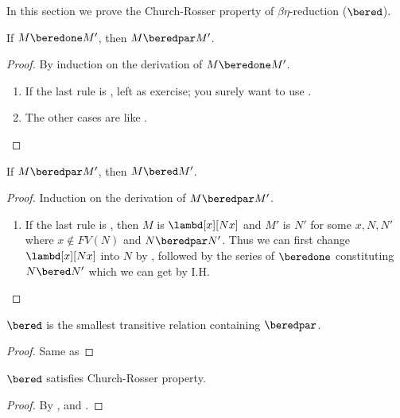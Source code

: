 \documentclass[../../../include/open-logic-section]{subfiles}
\begin{document}


In this section we prove the Church-Rosser property of
$\beta\eta$-reduction ($\bered$).

\begin{lem}
  If $M \beredone M'$, then $M \beredpar M'$.
\end{lem}
\begin{proof} By induction on the derivation of $M \beredone M'$.
  \begin{enumerate}
  \item If the last rule is , left as exercise;
    you surely want to use .
  \item The other cases are like .
  \end{enumerate}
\end{proof}

\begin{lem}
  If $M \beredpar M'$, then $M \bered M'$.
\end{lem}
\begin{proof} Induction on the derivation of $M \beredpar M'$.
  \begin{enumerate}
    \item If the last rule is , then $M$ is
      $\lambd[x][Nx]$ and $M'$ is $N'$ for some $x, N, N'$ where $x
      \notin FV(N)$ and $N \beredpar N'$. Thus we can first change
      $\lambd[x][Nx]$ into $N$ by , followed by
      the series of $\beredone$ constituting $N \bered N'$ which we
      can get by I.H.
  \end{enumerate}
\end{proof}


\begin{lem}
  $\bered$ is the smallest transitive relation containing $\beredpar$.
\end{lem}
\begin{proof}
  Same as 
\end{proof}

\begin{thm}
  $\bered$ satisfies Church-Rosser property.
\end{thm}
\begin{proof}
  By ,  and .
\end{proof}
\end{document}
